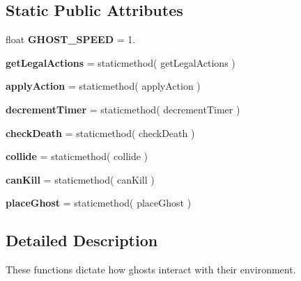 \subsection*{Static Public Attributes}
\begin{DoxyCompactItemize}
\item 
\mbox{\label{classpacman_1_1_ghost_rules_aebac2d1a41f6ab9264e4d1f96d34c5a7}} 
float {\bfseries G\+H\+O\+S\+T\+\_\+\+S\+P\+E\+ED} = 1.
\item 
\mbox{\label{classpacman_1_1_ghost_rules_a49be343751caa936de632344b5fea06c}} 
{\bfseries get\+Legal\+Actions} = staticmethod( get\+Legal\+Actions )
\item 
\mbox{\label{classpacman_1_1_ghost_rules_a886a1e7eb522fe15c2985a681ae56b1f}} 
{\bfseries apply\+Action} = staticmethod( apply\+Action )
\item 
\mbox{\label{classpacman_1_1_ghost_rules_ac6c43c3d3195b9a7e3c60161b32ef416}} 
{\bfseries decrement\+Timer} = staticmethod( decrement\+Timer )
\item 
\mbox{\label{classpacman_1_1_ghost_rules_a451aa087637c3e9d853eb3b3ba8ae65e}} 
{\bfseries check\+Death} = staticmethod( check\+Death )
\item 
\mbox{\label{classpacman_1_1_ghost_rules_a363ec0ec93ac5440a06de47d492f8450}} 
{\bfseries collide} = staticmethod( collide )
\item 
\mbox{\label{classpacman_1_1_ghost_rules_af7953fe487ff87de00c62ce368c2b67c}} 
{\bfseries can\+Kill} = staticmethod( can\+Kill )
\item 
\mbox{\label{classpacman_1_1_ghost_rules_ac6098b781cc1cc40a85441355a407a95}} 
{\bfseries place\+Ghost} = staticmethod( place\+Ghost )
\end{DoxyCompactItemize}


\subsection{Detailed Description}
\begin{DoxyVerb}These functions dictate how ghosts interact with their environment.
\end{DoxyVerb}
 

